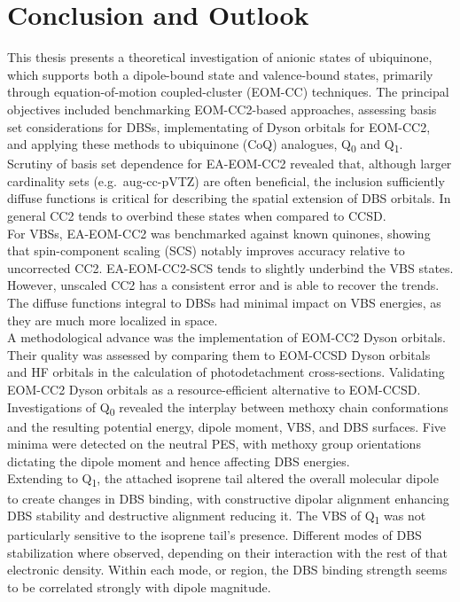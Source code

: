 \chapter{Conclusion and Outlook}\label{ch:conclusion}
This thesis presents a theoretical investigation of anionic states of ubiquinone, which supports both a dipole-bound state and valence-bound states, primarily through equation-of-motion coupled-cluster (EOM-CC) techniques. The principal objectives included benchmarking EOM-CC2-based approaches, assessing basis set considerations for DBSs, implementating of Dyson orbitals for EOM-CC2, and applying these methods to ubiquinone (CoQ) analogues, Q\textsubscript{0} and Q\textsubscript{1}.\\

Scrutiny of basis set dependence for EA-EOM-CC2 revealed that, although larger cardinality sets (e.g.\ aug-cc-pVTZ) are often beneficial, the inclusion sufficiently diffuse functions is critical for describing the spatial extension of DBS orbitals. In general CC2 tends to overbind these states when compared to CCSD.\\

For VBSs, EA-EOM-CC2 was benchmarked against known quinones, showing that spin-component scaling (SCS) notably improves accuracy relative to uncorrected CC2. EA-EOM-CC2-SCS tends to slightly underbind the VBS states. However, unscaled CC2 has a consistent error and is able to recover the trends. The diffuse functions integral to DBSs had minimal impact on VBS energies, as they are much more localized in space.\\

A methodological advance was the implementation of EOM-CC2 Dyson orbitals. Their quality was assessed by comparing them to EOM-CCSD Dyson orbitals and HF orbitals in the calculation of photodetachment cross-sections. Validating EOM-CC2 Dyson orbitals as a resource-efficient alternative to EOM-CCSD.\\

Investigations of Q\textsubscript{0} revealed the interplay between methoxy chain conformations and the resulting potential energy, dipole moment, VBS, and DBS surfaces. Five minima were detected on the neutral PES, with methoxy group orientations dictating the dipole moment and hence affecting DBS energies.\\

Extending to Q\textsubscript{1}, the attached isoprene tail altered the overall molecular dipole to create changes in DBS binding, with constructive dipolar alignment enhancing DBS stability and destructive alignment reducing it. The VBS of Q\textsubscript{1} was not particularly sensitive to the isoprene tail's presence.  Different modes of DBS stabilization where observed, depending on their interaction with the rest of that electronic density. Within each mode, or region, the DBS binding strength seems to be correlated strongly with dipole magnitude.\\

